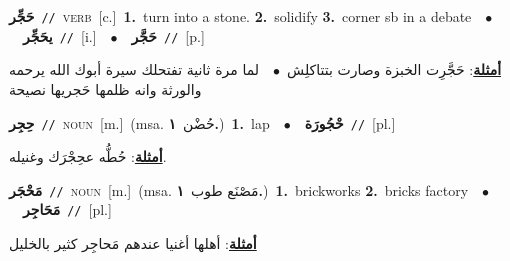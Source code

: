 \documentclass[10pt,a4paper,twoside]{article} %
\begin{document}
\begin{multicols}{2}
{{{{{{{{{{{\setlength\topsep{0pt}\textbf{\foreignlanguage{arabic}{حَجِّر}}\ {\color{gray}\texttt{//}\color{black}}\ \textsc{verb}\ [c.]\ \textbf{1.}~turn into a stone.  \textbf{2.}~solidify  \textbf{3.}~corner sb in a debate\ \ $\bullet$\ \ \setlength\topsep{0pt}\textbf{\foreignlanguage{arabic}{يحَجِّر}}\ {\color{gray}\texttt{//}\color{black}}\ [i.]\ \ $\bullet$\ \ \setlength\topsep{0pt}\textbf{\foreignlanguage{arabic}{حَجَّر}}\ {\color{gray}\texttt{//}\color{black}}\ [p.]\  \begin{flushright}\color{gray}\foreignlanguage{arabic}{\textbf{\underline{\foreignlanguage{arabic}{أمثلة}}}: حَجَّرِت الخبزة وصارت بتتاكلِش\ $\bullet$\ \  لما مرة ثانية تفتحلك سيرة أبوك الله يرحمه والورثة وانه ظلمها حَجريها نصيحة}\end{flushright}\color{black}} \vspace{2mm}

{\setlength\topsep{0pt}\textbf{\foreignlanguage{arabic}{حِجِر}}\ {\color{gray}\texttt{//}\color{black}}\ \textsc{noun}\ [m.]\ \color{gray}(msa. \foreignlanguage{arabic}{حُضْن}~\foreignlanguage{arabic}{\textbf{١.}})\color{black}\ \textbf{1.}~lap\ \ $\bullet$\ \ \setlength\topsep{0pt}\textbf{\foreignlanguage{arabic}{حْجُورَة}}\ {\color{gray}\texttt{//}\color{black}}\ [pl.]\  \begin{flushright}\color{gray}\foreignlanguage{arabic}{\textbf{\underline{\foreignlanguage{arabic}{أمثلة}}}: حُطُّه عحِجْرَك وغنيله.}\end{flushright}\color{black}} \vspace{2mm}

{\setlength\topsep{0pt}\textbf{\foreignlanguage{arabic}{مَحْجَر}}\ {\color{gray}\texttt{//}\color{black}}\ \textsc{noun}\ [m.]\ \color{gray}(msa. \foreignlanguage{arabic}{مَصْنَع طوب}~\foreignlanguage{arabic}{\textbf{١.}})\color{black}\ \textbf{1.}~brickworks  \textbf{2.}~bricks factory\ \ $\bullet$\ \ \setlength\topsep{0pt}\textbf{\foreignlanguage{arabic}{مَحَاجِر}}\ {\color{gray}\texttt{//}\color{black}}\ [pl.]\  \begin{flushright}\color{gray}\foreignlanguage{arabic}{\textbf{\underline{\foreignlanguage{arabic}{أمثلة}}}: أهلها أغنيا عندهم مَحاجِر كثير بالخليل}\end{flushright}\color{black}} \vspace{2mm}

}}}}}}}}}}
\end{multicols}
\end{document}
